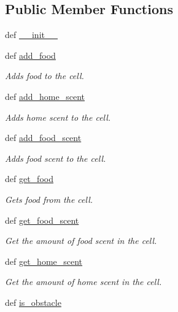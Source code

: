 \subsection*{Public Member Functions}
\begin{DoxyCompactItemize}
\item 
def \hyperlink{classworld_1_1Cell_a3dd387b6af13f7450acb97fb40c13a0e}{\+\_\+\+\_\+init\+\_\+\+\_\+}
\item 
def \hyperlink{classworld_1_1Cell_a3d9725f56b584acd9f75728f364975b0}{add\+\_\+food}
\begin{DoxyCompactList}\small\item\em Adds food to the cell. \end{DoxyCompactList}\item 
def \hyperlink{classworld_1_1Cell_a52af74786918c6c3f4d1d0b0f44aecb8}{add\+\_\+home\+\_\+scent}
\begin{DoxyCompactList}\small\item\em Adds home scent to the cell. \end{DoxyCompactList}\item 
def \hyperlink{classworld_1_1Cell_a773c26b2353ffaede745ee726d2e256d}{add\+\_\+food\+\_\+scent}
\begin{DoxyCompactList}\small\item\em Adds food scent to the cell. \end{DoxyCompactList}\item 
def \hyperlink{classworld_1_1Cell_ace4b7ca65667e6dcecb3c43e850c3568}{get\+\_\+food}
\begin{DoxyCompactList}\small\item\em Gets food from the cell. \end{DoxyCompactList}\item 
def \hyperlink{classworld_1_1Cell_ae69e7bafa4825b0e208d3bb74c25fe91}{get\+\_\+food\+\_\+scent}
\begin{DoxyCompactList}\small\item\em Get the amount of food scent in the cell. \end{DoxyCompactList}\item 
def \hyperlink{classworld_1_1Cell_aac71d7cc30cb979617b1ec8d9f4d9b26}{get\+\_\+home\+\_\+scent}
\begin{DoxyCompactList}\small\item\em Get the amount of home scent in the cell. \end{DoxyCompactList}\item 
def \hyperlink{classworld_1_1Cell_a890e2dc899a32ef86c131a98879e9023}{is\+\_\+obstacle}

\end{DoxyCompactItemize}
